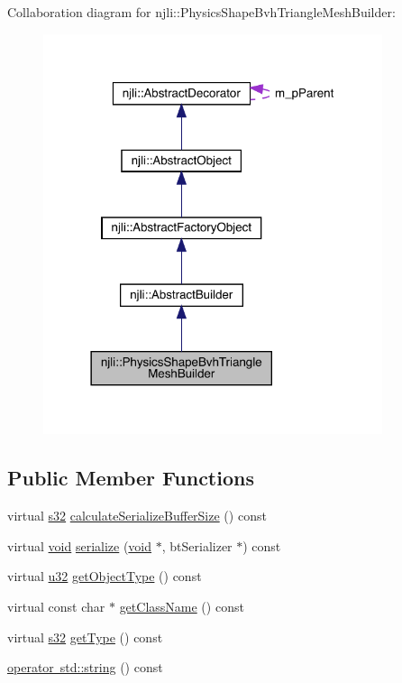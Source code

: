 Collaboration diagram for njli\+:\+:Physics\+Shape\+Bvh\+Triangle\+Mesh\+Builder\+:\nopagebreak
\begin{figure}[H]
\begin{center}
\leavevmode
\includegraphics[width=282pt]{classnjli_1_1_physics_shape_bvh_triangle_mesh_builder__coll__graph}
\end{center}
\end{figure}
\subsection*{Public Member Functions}
\begin{DoxyCompactItemize}
\item 
virtual \mbox{\hyperlink{_util_8h_aa62c75d314a0d1f37f79c4b73b2292e2}{s32}} \mbox{\hyperlink{classnjli_1_1_physics_shape_bvh_triangle_mesh_builder_af797e698d40eb6aef835f8d346a3e52c}{calculate\+Serialize\+Buffer\+Size}} () const
\item 
virtual \mbox{\hyperlink{_thread_8h_af1e856da2e658414cb2456cb6f7ebc66}{void}} \mbox{\hyperlink{classnjli_1_1_physics_shape_bvh_triangle_mesh_builder_a2ee0c6483dcec7a031bdee49488eba7b}{serialize}} (\mbox{\hyperlink{_thread_8h_af1e856da2e658414cb2456cb6f7ebc66}{void}} $\ast$, bt\+Serializer $\ast$) const
\item 
virtual \mbox{\hyperlink{_util_8h_a10e94b422ef0c20dcdec20d31a1f5049}{u32}} \mbox{\hyperlink{classnjli_1_1_physics_shape_bvh_triangle_mesh_builder_a5be31b8731f8a5ebc9c742b1c4e88181}{get\+Object\+Type}} () const
\item 
virtual const char $\ast$ \mbox{\hyperlink{classnjli_1_1_physics_shape_bvh_triangle_mesh_builder_a45f239131aefd54239593232c7926dcf}{get\+Class\+Name}} () const
\item 
virtual \mbox{\hyperlink{_util_8h_aa62c75d314a0d1f37f79c4b73b2292e2}{s32}} \mbox{\hyperlink{classnjli_1_1_physics_shape_bvh_triangle_mesh_builder_a356f9a0d887db5defe1748427a9be4e4}{get\+Type}} () const
\item 
\mbox{\hyperlink{classnjli_1_1_physics_shape_bvh_triangle_mesh_builder_a3df3eb3e133b76fb247ff6b9fae01a72}{operator std\+::string}} () const
\end{DoxyCompactItemize}
